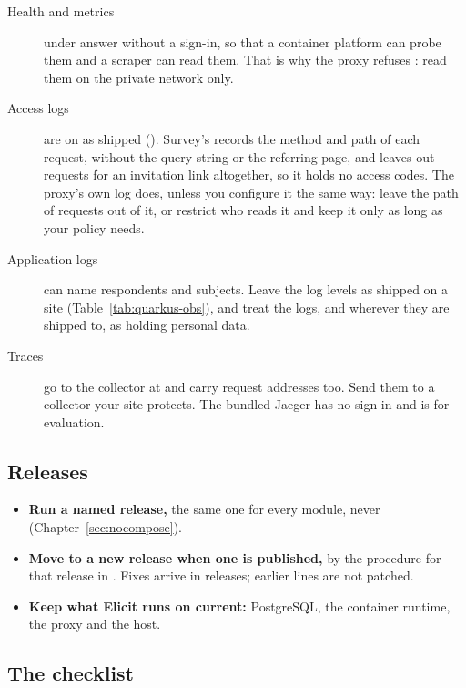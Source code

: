 \documentclass[11pt, a4paper]{article}
\begin{document}
\begin{description}
  \item[Health and metrics] under  answer without a sign-in, so that a container
        platform can probe them and a scraper can read them. That is why the proxy refuses
        : read them on the private network only.
  \item[Access logs] are on as shipped (). Survey's
        records the method and path of each request, without the query string or the
        referring page, and leaves out requests for an invitation link altogether, so it holds
        no access codes. The proxy's own log does, unless you configure it the same way: leave
        the path of  requests out of it, or restrict who reads it and keep it only
        as long as your policy needs.
  \item[Application logs] can name respondents and subjects. Leave the log levels as shipped
        on a site (Table~\ref{tab:quarkus-obs}), and treat the logs, and wherever they are
        shipped to, as holding personal data.
  \item[Traces] go to the collector at  and carry
        request addresses too. Send them to a collector your site protects. The bundled
        Jaeger has no sign-in and is for evaluation.
\end{description}

\subsection{Releases}
\label{sec:security-releases}

\begin{itemize}
  \item \textbf{Run a named release,} the same one for every module, never 
        (Chapter~\ref{sec:nocompose}).
  \item \textbf{Move to a new release when one is published,} by the procedure for that
        release in . Fixes arrive in releases; earlier lines are not
        patched.
  \item \textbf{Keep what Elicit runs on current:} PostgreSQL, the container runtime, the
        proxy and the host.
\end{itemize}

\subsection{The checklist}
\label{sec:security-checklist}
\end{document}
